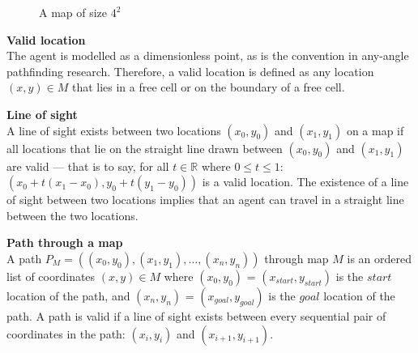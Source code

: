 \documentclass[12pt,notitlepage]{report}
\begin{document}
\begin{figure}
\centering
  \caption{A map of size $4^{2}$}
\end{figure}

\begin{description}
\item{\bfseries Valid location}\\
The agent is modelled as a dimensionless point, as is the convention\cite{Daniel10} in any-angle pathfinding research. Therefore, a valid location is defined as any location $(x,y) \in M$ that lies in a free cell or on the boundary of a free cell.\\

\item{\bfseries Line of sight}\\
A line of sight exists between two locations $(x_{0},y_{0})$ and $(x_{1},y_{1})$ on a map if all locations that lie on the straight line drawn between $(x_{0},y_{0})$ and $(x_{1},y_{1})$ are valid --- that is to say, for all $t \in \mathbb{R}$ where $0 \leq t \leq 1$: $(x_{0} + t(x_{1}-x_{0}),y_{0} + t(y_{1}-y_{0}))$ is a valid location. The existence of a line of sight between two locations implies that an agent can travel in a straight line between the two locations.\\

\item{\bfseries Path through a map}\\
A path  $P_{M} = ((x_{0},y_{0}), (x_{1},y_{1}), \ldots, (x_{n},y_{n}))$ through map $M$ is an ordered list of coordinates $(x,y) \in M$ where $(x_{0},y_{0})$ = $(x_{start},y_{start})$ is the $start$ location of the path, and $(x_{n},y_{n})$ = $(x_{goal},y_{goal})$ is the $goal$ location of the path. A path is valid if a line of sight exists between every sequential pair of coordinates in the path: $(x_{i},y_{i})$ and $(x_{i+1},y_{i+1})$.\\
\end{description}
\end{document}
